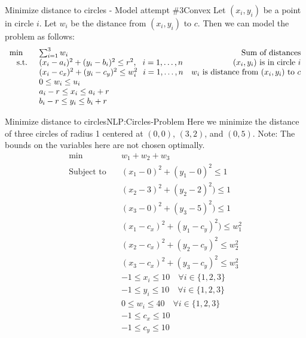 \documentclass[../open-optimization/open-optimization.tex]{subfiles}
\begin{document}
\begin{general}{Minimize distance to circles - Model attempt $\#3$}{Convex}
Let $(x_i,y_i)$ be a point in circle $i$.  Let $w_i$ be the distance from $(x_i, y_i)$ to $c$.  Then we can  model the problem as follows:
\begin{equation}
\begin{array}{rlr}
\min \quad & \sum_{i=1}^3 w_i \hfill & \text{ Sum of distances}\\
\text{ s.t. } & (x_i - a_i)^2  + (y_i - b_i)^2  \leq r^2 , \ \ i=1,\dots, n& \text{ $(x_i, y_i)$ is in circle $i$}\\
& (x_i - c_x)^2 + (y_i - c_y)^2\leq w_i^2 \ \ i=1, \dots, n & \text{$w_i$ is distance from $(x_i, y_i)$ to $c$}\\
& 0 \leq w_i \leq u_i\\
& a_i - r \leq x_i \leq a_i + r\\
& b_i -r \leq y_i \leq b_i + r\\
\end{array}
\end{equation}
\end{general}

\begin{examplewithcode}{Minimize distance to circles}{NLP:Circles-Problem}
Here we minimize the distance of three circles of radius 1 centered at $(0,0)$, $(3,2)$, and $(0,5)$.  
Note: The bounds on the variables here are not chosen optimally. 
\begin{align*}\min\quad & w_{1} + w_{2} + w_{3}\\
\text{Subject to} \quad & (x_{1} - 0) ^ 2 + (y_{1} - 0)^ 2  \leq 1\\
 & (x_{2} - 3) ^ 2 + (y_{2} - 2) ^ 2)  \leq 1\\
 & (x_{3} - 0) ^ 2 + (y_{3} - 5) ^ 2)  \leq 1\\
 & (x_{1} - c_x) ^ 2 + (y_{1} - c_y) ^ 2) \leq w_{1}^ 2\\
 & (x_{2} - c_x) ^ 2 + (y_{2} - c_y) ^ 2\leq w_{2}^ 2\\
 & (x_{3} - c_x) ^ 2 + (y_{3} - c_y) ^ 2\leq w_{3}^ 2\\
 & -1 \leq x_{i} \leq 10 \quad\forall i \in \{1,2,3\}\\
 & -1 \leq y_{i} \leq 10 \quad\forall i \in \{1,2,3\}\\
 & 0 \leq w_{i} \leq 40 \quad\forall i \in \{1,2,3\}\\
 & -1 \leq c_x \leq 10\\
 & -1 \leq c_y \leq 10\\
\end{align*}
\end{examplewithcode}
\end{document}
